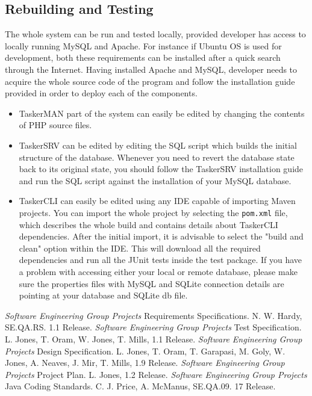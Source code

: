 \documentclass{project}
\begin{document}
\subsection{Rebuilding and Testing}
The whole system can be run and tested locally, provided developer has access to 
locally running MySQL and Apache. For instance if Ubuntu OS is used for development,
both these requirements can be installed after a quick search through the Internet.
Having installed Apache and MySQL, developer needs to acquire the whole source code
of the program and follow the installation guide provided in order to deploy each
of the components.
\begin{itemize}
  \item TaskerMAN part of the system can easily be edited by changing the contents of
    PHP source files.
  \item TaskerSRV can be edited by editing the SQL script which builds the initial structure
    of the database. Whenever you need to revert the database state back to its original 
    state, you should follow the TaskerSRV installation guide and run the SQL script
    against the installation of your MySQL database.
  \item TaskerCLI can easily be edited using any IDE capable of importing Maven projects.
    You can import the whole project by selecting the \texttt{pom.xml} file, which 
    describes the whole build and contains details about TaskerCLI dependencies. After the
    initial import, it is advisable to select the "build and clean" option within the IDE.
    This will download all the required dependencies and run all the JUnit tests inside
    the test package. If you have a problem with accessing either your local or remote
    database, please make sure the properties files with MySQL and SQLite connection
    details are pointing at your database and SQLite db file. 
\end{itemize}
\clearpage

\begin{thebibliography}{12}
 \emph{Software Engineering Group Projects}
Requirements Specifications.
N. W. Hardy, SE.QA.RS. 1.1 Release.
 \emph{Software Engineering Group Projects}
Test Specification.
L. Jones, T. Oram, W. Jones, T. Mills, 1.1 Release.
 \emph{Software Engineering Group Projects}
Design Specification.
L. Jones, T. Oram, T. Garapasi, M. Goly, W. Jones, A. Neaves, J. Mir, T. Mills, 1.9 Release.
 \emph{Software Engineering Group Projects}
Project Plan.
L. Jones, 1.2 Release.
 \emph{Software Engineering Group Projects}
Java Coding Standards.
C. J. Price, A. McManus, SE.QA.09. 17 Release.
\end{thebibliography}
\end{document}
